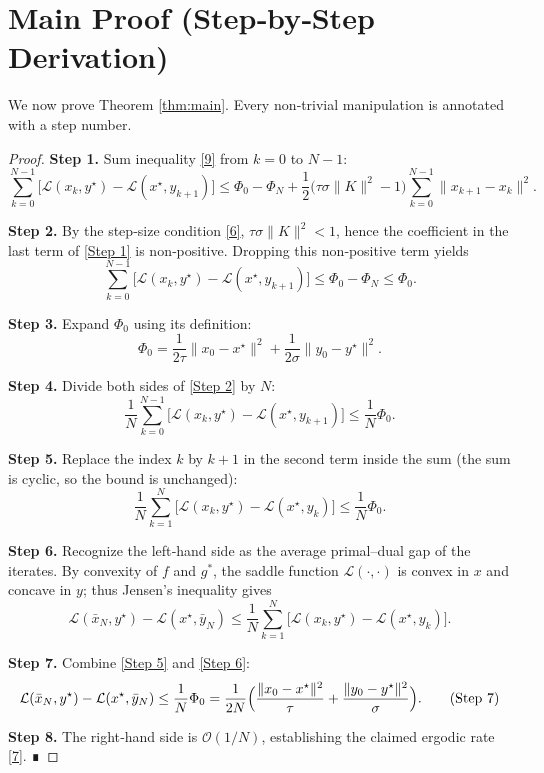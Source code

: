 \documentclass{article}
\newcommand{\norm}[1]{\|#1\|}
\begin{document}
\section*{Main Proof (Step‑by‑Step Derivation)}
We now prove Theorem \ref{thm:main}. Every non‑trivial manipulation is annotated with a step number.

\begin{proof}
\textbf{Step 1.}  Sum inequality \eqref{9} from $k=0$ to $N-1$:
\[
\sum_{k=0}^{N-1}\bigl[\mathcal{L}(x_{k},y^{\star})-\mathcal{L}(x^{\star},y_{k+1})\bigr]
\le \Phi_{0}-\Phi_{N}
+\frac{1}{2}\bigl(\tau\sigma\|K\|^{2}-1\bigr)
\sum_{k=0}^{N-1}\norm{x_{k+1}-x_{k}}^{2}.
\tag{Step 1}
\]

\textbf{Step 2.}  By the step‑size condition \eqref{6}, $\tau\sigma\|K\|^{2}<1$, hence the coefficient in the last term of \eqref{Step 1} is non‑positive. Dropping this non‑positive term yields
\[
\sum_{k=0}^{N-1}\bigl[\mathcal{L}(x_{k},y^{\star})-\mathcal{L}(x^{\star},y_{k+1})\bigr]
\le \Phi_{0}-\Phi_{N}\le \Phi_{0}.
\tag{Step 2}
\]

\textbf{Step 3.}  Expand $\Phi_{0}$ using its definition:
\[
\Phi_{0}= \frac{1}{2\tau}\norm{x_{0}-x^{\star}}^{2}
+\frac{1}{2\sigma}\norm{y_{0}-y^{\star}}^{2}.
\tag{Step 3}
\]

\textbf{Step 4.}  Divide both sides of \eqref{Step 2} by $N$:
\[
\frac{1}{N}\sum_{k=0}^{N-1}\bigl[\mathcal{L}(x_{k},y^{\star})-\mathcal{L}(x^{\star},y_{k+1})\bigr]
\le \frac{1}{N}\Phi_{0}.
\tag{Step 4}
\]

\textbf{Step 5.}  Replace the index $k$ by $k+1$ in the second term inside the sum (the sum is cyclic, so the bound is unchanged):
\[
\frac{1}{N}\sum_{k=1}^{N}\bigl[\mathcal{L}(x_{k},y^{\star})-\mathcal{L}(x^{\star},y_{k})\bigr]
\le \frac{1}{N}\Phi_{0}.
\tag{Step 5}
\]

\textbf{Step 6.}  Recognize the left‑hand side as the average primal–dual gap of the iterates. By convexity of $f$ and $g^{*}$, the saddle function $\mathcal{L}(\cdot,\cdot)$ is convex in $x$ and concave in $y$; thus Jensen’s inequality gives
\[
\mathcal{L}(\bar{x}_{N},y^{\star})-\mathcal{L}(x^{\star},\bar{y}_{N})
\le
\frac{1}{N}\sum_{k=1}^{N}\bigl[\mathcal{L}(x_{k},y^{\star})-\mathcal{L}(x^{\star},y_{k})\bigr].
\tag{Step 6}
\]

\textbf{Step 7.}  Combine \eqref{Step 5} and \eqref{Step 6}:
\[
\mathcal{L}(\bar{x}_{N},y^{\star})-\mathcal{L}(x^{\star},\bar{y}_{N})
\le \frac{1}{N}\Phi_{0}
= \frac{1}{2N}\Bigl(\frac{\norm{x_{0}-x^{\star}}^{2}}{\tau}
+\frac{\norm{y_{0}-y^{\star}}^{2}}{\sigma}\Bigr).
\tag{Step 7}
\]

\textbf{Step 8.}  The right‑hand side is $\mathcal{O}(1/N)$, establishing the claimed ergodic rate \eqref{7}. ∎
\end{proof}
\end{document}
